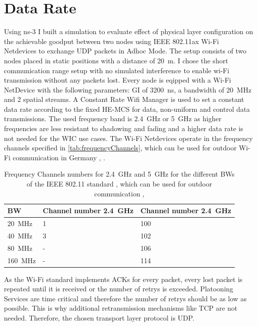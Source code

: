 \section{Data Rate}

Using ns-3 I built a simulation to evaluate effect of physical layer configuration on the achievable goodput between two nodes using IEEE 802.11ax Wi-Fi Netdevices to exchange UDP packets in Adhoc Mode.
The setup consists of two nodes placed in static positions with a distance of \SI{20}{\metre}. I chose the short communication range setup with no simulated interference to enable wi-Fi transmission without any packets lost.
Every node is eqipped with a Wi-Fi NetDevice with the following parameters: \ac{GI} of \SI{3200}{\nano\second}, a bandwidth of \SI{20}{\mega\hertz} and 2 spatial streams.
A Constant Rate Wifi Manager is used to set a constant data rate according to the fixed HE-\ac{MCS} for data, non-uniform and control data transmissions. The used frequency band is \SI{2.4}{\giga\hertz} or \SI{5}{\giga\hertz} as
higher frequencies are less resistant to shadowing and fading and a higher data rate is not needed for the \ac{WIC} use cases.
The Wi-Fi Netdevices operate in the frequency channels specified in \autoref{tab:frequencyChannels}, which can be used for
outdoor Wi-Fi communication in Germany \cite{freq_plan_24G}, \cite{freq_plan_5G}.

\begin{table}
	\centering
	\begin{tabular}{>{\centering}p{2cm}p{4cm}p{4cm}}
		\toprule
		\ac{BW} & Channel number \SI{2.4}{\giga\hertz} & Channel number \SI{2.4}{\giga\hertz}\\
		\midrule
		\SI{20}{\mega\hertz} & \num{1}&
		\num{100} \\
		\SI{40}{\mega\hertz} &
		\num{3}
		& \num{102} \\
		\SI{80}{\mega\hertz} &
		- & \num{106} \\
		\SI{160}{\mega\hertz} & -
		& \num{114} \\
		\bottomrule
	\end{tabular}
	\caption{Frequency Channels numbers for \SI{2.4}{\giga\hertz} and \SI{5}{\giga\hertz} for the different \acf{BW}s of the IEEE 802.11 standard \cite{noauthor_ieee_2021-1}, which can be used for
	outdoor communication \cite{freq_plan_24G}, \cite{freq_plan_5G}}
	\label{tab:frequencyChannels}
\end{table}

As the Wi-Fi standard implements ACKs for every packet, every lost packet is repeated until it is received or the number of retrys is
exceeded. Platooning Services are time critical and therefore the number of retrys should be as low as possible. This is why additional
retransmission mechanisms like TCP are not needed. Therefore, the chosen transport layer protocol is UDP.

